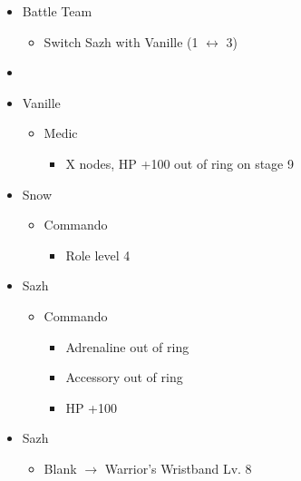 \begin{menu}
\begin{itemize}
    \paradigm
    \begin{itemize}
        \item Battle Team
        \begin{itemize}
            \item Switch Sazh with Vanille (1 $\leftrightarrow$ 3)
        \end{itemize}
        \item {}%
{\paradigmline{(\med)}{\com}{(\com)}}%
{\paradigmline{(\sab)}{\com}{\com}}%
{\paradigmline{(\sab)}{\sen}{(\syn)}}%
{\paradigmline{(\rav)}{(\rav)}{\com}}%
{\paradigmline[5]{\textit{(\sab)}}{\textit{(\rav)}}{\textit{\rav}}}%
{\paradigmline{\rav}{\rav}{\rav}}
    \end{itemize}
    \crystarium
    \begin{itemize}
        \item Vanille
        \begin{itemize}
            \item Medic
            \begin{itemize}
            	\item X nodes, HP +100 out of ring on stage 9
            \end{itemize}
        \end{itemize}
        \item Snow
        \begin{itemize}
            \item Commando
            \begin{itemize}
                \item Role level 4
            \end{itemize}
        \end{itemize}
        \item Sazh
        \begin{itemize}
            \item Commando
            \begin{itemize}
                \item Adrenaline out of ring
                \item Accessory out of ring
                \item HP +100
            \end{itemize}
        \end{itemize}
    \end{itemize}
    \equip
    \begin{itemize}
        \item Sazh
        \begin{itemize}
            \item Blank $\rightarrow$ Warrior's Wristband Lv. 8
        \end{itemize}
    \end{itemize}
\end{itemize}
\end{menu}

